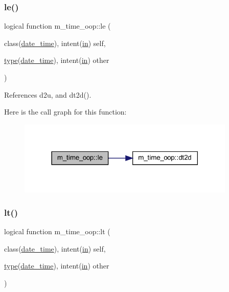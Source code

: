 \subsubsection{\texorpdfstring{le()}{le()}}
{\footnotesize\ttfamily logical function m\+\_\+time\+\_\+oop\+::le (\begin{DoxyParamCaption}\item[{class(\hyperlink{structm__time__oop_1_1date__time}{date\+\_\+time}), intent(\hyperlink{M__journal_83_8txt_afce72651d1eed785a2132bee863b2f38}{in})}]{self,  }\item[{\hyperlink{stop__watch_83_8txt_a70f0ead91c32e25323c03265aa302c1c}{type}(\hyperlink{structm__time__oop_1_1date__time}{date\+\_\+time}), intent(\hyperlink{M__journal_83_8txt_afce72651d1eed785a2132bee863b2f38}{in})}]{other }\end{DoxyParamCaption})\hspace{0.3cm}{\ttfamily [private]}}



References d2u, and dt2d().

Here is the call graph for this function\+:
\nopagebreak
\begin{figure}[H]
\begin{center}
\leavevmode
\includegraphics[width=294pt]{namespacem__time__oop_a5e04ff772ac6d72f68031ec43c1e6c84_cgraph}
\end{center}
\end{figure}
\mbox{\label{namespacem__time__oop_ab0c5ce86d25993804501d59a8106818f}} 
\subsubsection{\texorpdfstring{lt()}{lt()}}
{\footnotesize\ttfamily logical function m\+\_\+time\+\_\+oop\+::lt (\begin{DoxyParamCaption}\item[{class(\hyperlink{structm__time__oop_1_1date__time}{date\+\_\+time}), intent(\hyperlink{M__journal_83_8txt_afce72651d1eed785a2132bee863b2f38}{in})}]{self,  }\item[{\hyperlink{stop__watch_83_8txt_a70f0ead91c32e25323c03265aa302c1c}{type}(\hyperlink{structm__time__oop_1_1date__time}{date\+\_\+time}), intent(\hyperlink{M__journal_83_8txt_afce72651d1eed785a2132bee863b2f38}{in})}]{other }\end{DoxyParamCaption})\hspace{0.3cm}{\ttfamily [private]}}



